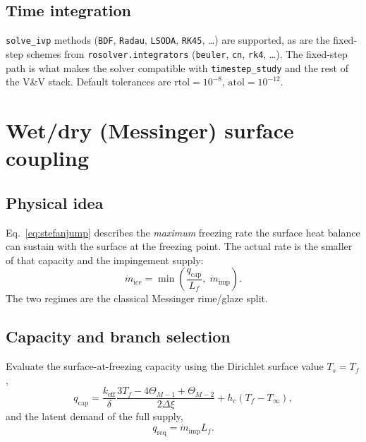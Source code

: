 \documentclass[11pt,a4paper]{article}
\newcommand{\Ts}{T_s}
\newcommand{\Tinf}{T_\infty}
\newcommand{\Tf}{T_f}
\newcommand{\Lf}{L_f}
\newcommand{\keff}{k_{\mathrm{eff}}}
\newcommand{\mdot}{\dot m}
\begin{document}
\subsection{Time integration}

\texttt{solve\_ivp} methods (\texttt{BDF}, \texttt{Radau}, \texttt{LSODA}, \texttt{RK45},
\dots) are supported, as are the fixed-step schemes from \texttt{rosolver.integrators}
(\texttt{beuler}, \texttt{cn}, \texttt{rk4}, \dots). The fixed-step path is what makes the
solver compatible with \texttt{timestep\_study} and the rest of the V\&V stack.
Default tolerances are $\mathrm{rtol}=10^{-8}$, $\mathrm{atol}=10^{-12}$.

\section{Wet/dry (Messinger) surface coupling}\label{sec:wetdry}

\subsection{Physical idea}

Eq.~\eqref{eq:stefanjump} describes the \emph{maximum} freezing rate the surface heat
balance can sustain with the surface at the freezing point. The actual rate is the
smaller of that capacity and the impingement supply:
\begin{equation}
  \mdot_{\mathrm{ice}}=\min\!\left(\frac{q_{\mathrm{cap}}}{\Lf},\;\mdot_{\mathrm{imp}}\right).
\end{equation}
The two regimes are the classical Messinger rime/glaze split.

\subsection{Capacity and branch selection}

Evaluate the surface-at-freezing capacity using the Dirichlet surface value $\Ts=\Tf$,
\begin{equation}\label{eq:qcap}
  q_{\mathrm{cap}}
  =\frac{\keff}{\delta}
     \frac{3\Tf-4\Theta_{M-1}+\Theta_{M-2}}{2\Delta\xi}
   +h_c\left(\Tf-\Tinf\right),
\end{equation}
and the latent demand of the full supply,
\begin{equation}
  q_{\mathrm{req}}=\mdot_{\mathrm{imp}}\Lf .
\end{equation}
\end{document}
